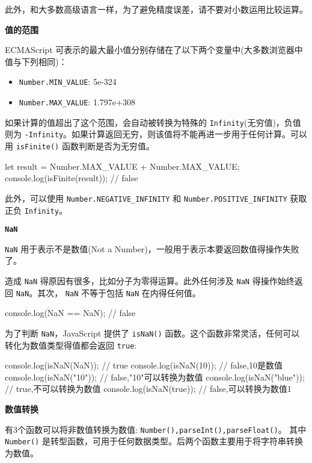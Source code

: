 此外，和大多数高级语言一样，为了避免精度误差，请不要对小数运用比较运算。

\noindent\textbf{值的范围}

ECMAScript 可表示的最大最小值分别存储在了以下两个变量中(大多数浏览器中值与下列相同)：

\begin{itemize}
    \item \texttt{Number.MIN\_VALUE}: 5e-324
    \item \texttt{Number.MAX\_VALUE}: 1.797e+308
\end{itemize}

如果计算的值超出了这个范围，会自动被转换为特殊的 \texttt{Infinity}(无穷值)，负值则为 \texttt{-Infinity}。如果计算返回无穷，则该值将不能再进一步用于任何计算。可以用 \texttt{isFinite()} 函数判断是否为无穷值。

\begin{JavaScript}
let result = Number.MAX_VALUE + Number.MAX_VALUE;
console.log(isFinite(result));      // false
\end{JavaScript}

此外，可以使用 \texttt{Number.NEGATIVE\_INFINITY} 和 \texttt{Number.POSITIVE\_INFINITY} 获取正负 \texttt{Infinity}。

\noindent\textbf{\texttt{NaN}}

\texttt{NaN} 用于表示不是数值(Not a Number)，一般用于表示本要返回数值得操作失败了。

造成 \texttt{NaN} 得原因有很多，比如分子为零得运算。此外任何涉及 \texttt{NaN} 得操作始终返回 \texttt{NaN}。其次， \texttt{NaN} 不等于包括 \texttt{NaN} 在内得任何值。

\begin{JavaScript}
console.log(NaN == NaN);    // false
\end{JavaScript}

为了判断 \texttt{NaN}，JavaScript 提供了 \texttt{isNaN()} 函数。这个函数非常灵活，任何可以转化为数值类型得值都会返回 \texttt{true}:

\begin{JavaScript}
console.log(isNaN(NaN));        // true
console.log(isNaN(10));         // false,10是数值
console.log(isNaN("10"));       // false,"10"可以转换为数值
console.log(isNaN("blue"));     // true,不可以转换为数值
console.log(isNaN(true));       // false,可以转换为数值1
\end{JavaScript}

\noindent\textbf{数值转换}

有3个函数可以将非数值转换为数值: \texttt{Number(),parseInt(),parseFloat()}。 其中 \texttt{Number()} 是转型函数，可用于任何数据类型。后两个函数主要用于将字符串转换为数值。

